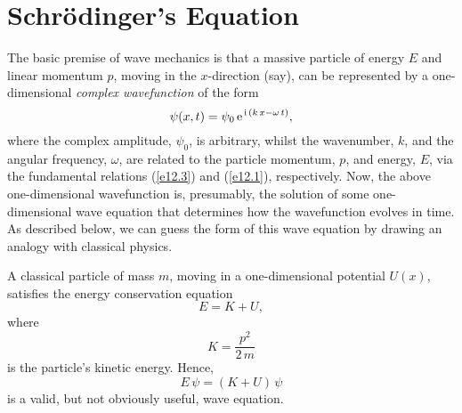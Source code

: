 \section{Schr\"{o}dinger's Equation}\label{s12.5}
The basic premise of wave mechanics is that a massive particle of energy $E$ and linear momentum $p$, moving in the $x$-direction (say), 
can be represented by a one-dimensional {\em complex wavefunction}\/ of the form
\begin{equation}\label{e12.13a}
\psi(x,t) = \psi_0\,{\rm e}^{\,{\rm i}\,(k\,x-\omega\,t)},
\end{equation}
where the complex amplitude, $\psi_0$, is arbitrary, whilst the wavenumber, $k$, and the angular frequency, $\omega$,
are related to the particle momentum, $p$, and energy, $E$, via the fundamental
relations (\ref{e12.3}) and (\ref{e12.1}), respectively. Now, the above one-dimensional wavefunction is, presumably, the solution of
some one-dimensional wave equation that determines how the wavefunction evolves in time. 
As described below, we can guess the form of this wave equation by drawing an analogy with classical physics.

A classical particle of mass $m$, moving in a one-dimensional potential $U(x)$, satisfies the energy conservation
equation
\begin{equation}
E = K+ U,
\end{equation}
where
\begin{equation}
K = \frac{p^2}{2\,m}
\end{equation}
is the particle's kinetic energy. Hence, 
\begin{equation}\label{e12.16}
E\,\psi = (K+U)\,\psi
\end{equation}
is a valid, but not obviously useful,  wave equation. 

